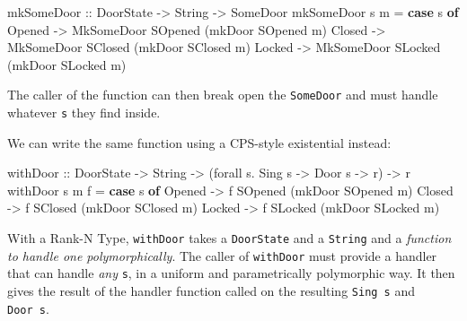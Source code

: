 \documentclass[]{article}
\newenvironment{Shaded}{}{}
\newcommand{\KeywordTok}[1]{\textcolor[rgb]{0.00,0.44,0.13}{\textbf{#1}}}
\newcommand{\DataTypeTok}[1]{\textcolor[rgb]{0.56,0.13,0.00}{#1}}
\newcommand{\OtherTok}[1]{\textcolor[rgb]{0.00,0.44,0.13}{#1}}
\newcommand{\FunctionTok}[1]{\textcolor[rgb]{0.02,0.16,0.49}{#1}}
\newcommand{\NormalTok}[1]{#1}
\begin{document}
\begin{Shaded}
\begin{Highlighting}[]
\NormalTok{mkSomeDoor}
\OtherTok{    ::} \DataTypeTok{DoorState}
    \OtherTok{->} \DataTypeTok{String}
    \OtherTok{->} \DataTypeTok{SomeDoor}
\NormalTok{mkSomeDoor s m }\FunctionTok{=} \KeywordTok{case}\NormalTok{ s }\KeywordTok{of}
    \DataTypeTok{Opened} \OtherTok{->} \DataTypeTok{MkSomeDoor} \DataTypeTok{SOpened}\NormalTok{ (mkDoor }\DataTypeTok{SOpened}\NormalTok{ m)}
    \DataTypeTok{Closed} \OtherTok{->} \DataTypeTok{MkSomeDoor} \DataTypeTok{SClosed}\NormalTok{ (mkDoor }\DataTypeTok{SClosed}\NormalTok{ m)}
    \DataTypeTok{Locked} \OtherTok{->} \DataTypeTok{MkSomeDoor} \DataTypeTok{SLocked}\NormalTok{ (mkDoor }\DataTypeTok{SLocked}\NormalTok{ m)}
\end{Highlighting}
\end{Shaded}

The caller of the function can then break open the \texttt{SomeDoor} and must
handle whatever \texttt{s} they find inside.

We can write the same function using a CPS-style existential instead:

\begin{Shaded}
\begin{Highlighting}[]
\NormalTok{withDoor}
\OtherTok{    ::} \DataTypeTok{DoorState}
    \OtherTok{->} \DataTypeTok{String}
    \OtherTok{->}\NormalTok{ (forall s}\FunctionTok{.} \DataTypeTok{Sing}\NormalTok{ s }\OtherTok{->} \DataTypeTok{Door}\NormalTok{ s }\OtherTok{->}\NormalTok{ r) }\OtherTok{->}\NormalTok{ r}
\NormalTok{withDoor s m f }\FunctionTok{=} \KeywordTok{case}\NormalTok{ s }\KeywordTok{of}
    \DataTypeTok{Opened} \OtherTok{->}\NormalTok{ f }\DataTypeTok{SOpened}\NormalTok{ (mkDoor }\DataTypeTok{SOpened}\NormalTok{ m)}
    \DataTypeTok{Closed} \OtherTok{->}\NormalTok{ f }\DataTypeTok{SClosed}\NormalTok{ (mkDoor }\DataTypeTok{SClosed}\NormalTok{ m)}
    \DataTypeTok{Locked} \OtherTok{->}\NormalTok{ f }\DataTypeTok{SLocked}\NormalTok{ (mkDoor }\DataTypeTok{SLocked}\NormalTok{ m)}
\end{Highlighting}
\end{Shaded}

With a Rank-N Type, \texttt{withDoor} takes a \texttt{DoorState} and a
\texttt{String} and a \emph{function to handle one polymorphically}. The caller
of \texttt{withDoor} must provide a handler that can handle \emph{any}
\texttt{s}, in a uniform and parametrically polymorphic way. It then gives the
result of the handler function called on the resulting \texttt{Sing\ s} and
\texttt{Door\ s}.
\end{document}
